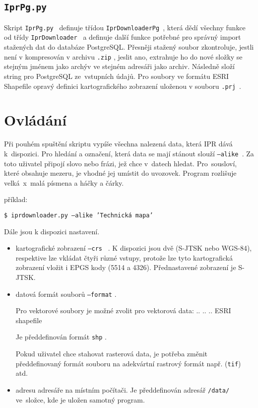 \subsection{{\tt IprPg.py}}
Skript {\tt IprPg.py } definuje třídou {\tt IprDownloaderPg }, která dědí 
všechny funkce od třídy {\tt IprDownloader } a definuje další funkce potřebné pro 
správný import stažených dat do databáze PostgreSQL. 
Přesněji stažený soubor zkontroluje, jestli není v kompresován v archivu 
{\tt *.zip} , jeslit ano, extrahuje ho do nové složky se stejným jménem jako
archýv ve stejném adresáři jako archiv. Následně složí string pro PostgreSQL 
ze~vstupních údajů. Pro soubory ve formátu ESRI Shapefile opravý definici 
kartografického zobrazení uloženou v souboru {\tt *.prj }. 


\section{Ovládání}
Při pouhém spuštění skriptu vypíše všechna nalezená data, která IPR dává 
k~dispozici. Pro hledání a označení, která data se mají stánout slouží 
{\tt ---alike }. Za toto uživatel připojí slovo nebo frázi, jež chce v~datech
hledat. Pro~sousloví, které obsahuje mezeru, je vhodné jej umístit do uvozovek. 
Program rozlišuje velká~x~malá písmena a háčky a čárky.

příklad:

{\tt \$ iprdownloader.py ---alike 'Technická mapa'}
  

Dále jsou k dispozici nastavení.
\begin{itemize}
    \item kartografické zobrazení {\tt ---crs } . K dispozici jsou dvě
     (S-JTSK nebo WGS-84), respektive lze vkládat čtyři různé vstupy, protože 
     lze tyto kartografická zobrazení vložit i EPGS kody (5514 a 4326). 
     Přednastavené zobrazení je S-JTSK.
    \item datová formát souborů {\tt ---format} .
    
    Pro vektorové soubory je možné zvolit pro vektorová data:
          ..   
          ..   
          ..                    
          ESRI shapefile
        
    Je předdefinován formát {\tt shp} .
         
    Pokud uživatel chce stahovat rasterová data, je potřeba změnit předdefinovaný
    formát souboru na adekvártní rastrový formát např. ({\tt tif}) atd.
    
    \item adresu adresáře na místním počítači. Je předdefinován adresář 
    {\tt /data/} ve~složce, kde je uložen samotný program.     
\end{itemize}

